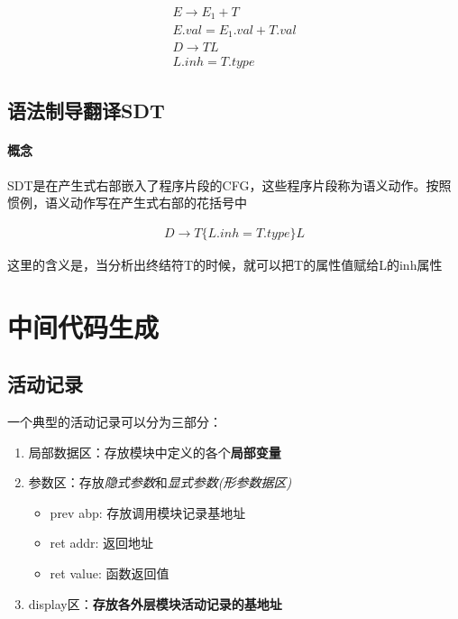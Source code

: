 \documentclass[UTF8]{ctexart} %
\begin{document}
\begin{equation}
    \begin{aligned}
        E\rightarrow E_1+T  \\
        E.val=E_1.val+T.val \\
        D\rightarrow TL     \\
        L.inh=T.type
    \end{aligned}
\end{equation}

\subsection{语法制导翻译SDT}

\paragraph{概念} SDT是在产生式右部嵌入了程序片段的CFG，这些程序片段称为语义动作。按照惯例，语义动作写在产生式右部的花括号中

\begin{equation}
    \begin{aligned}
        D\rightarrow T\{L.inh=T.type\} L
    \end{aligned}
\end{equation}

这里的含义是，当分析出终结符T的时候，就可以把T的属性值赋给L的inh属性

\section{中间代码生成}

\subsection{活动记录}

一个典型的活动记录可以分为三部分：

\begin{enumerate}
    \item 局部数据区：存放模块中定义的各个\textbf{局部变量}
    \item 参数区：存放\emph{隐式参数}和\emph{显式参数(形参数据区)}
          \begin{itemize}
              \item prev abp: 存放调用模块记录基地址
              \item ret addr: 返回地址
              \item ret value: 函数返回值
          \end{itemize}
    \item display区：\textbf{存放各外层模块活动记录的基地址}
\end{enumerate}
\end{document}
